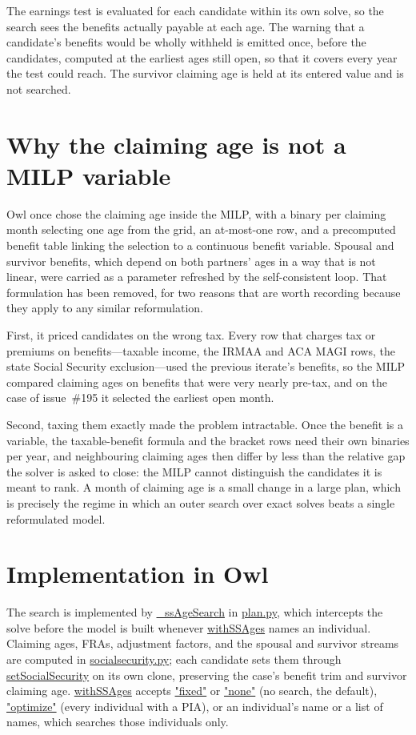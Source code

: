\documentclass[fleqn,12pt]{report}
\newcommand{\code}[1]{\url{#1}}
\begin{document}
The earnings test is evaluated for each candidate within its own solve, so the
search sees the benefits actually payable at each age.
The warning that a candidate's benefits would be wholly withheld is emitted once,
before the candidates, computed at the earliest ages still open, so that it
covers every year the test could reach.
The survivor claiming age is held at its entered value and is not searched.

\section{Why the claiming age is not a MILP variable}
\label{sec:ss-why-not-mip}

Owl once chose the claiming age inside the MILP, with a binary per claiming month
selecting one age from the grid, an at-most-one row, and a precomputed benefit
table linking the selection to a continuous benefit variable.
Spousal and survivor benefits, which depend on both partners' ages in a way that
is not linear, were carried as a parameter refreshed by the self-consistent loop.
That formulation has been removed, for two reasons that are worth recording
because they apply to any similar reformulation.

First, it priced candidates on the wrong tax.
Every row that charges tax or premiums on benefits---taxable income, the IRMAA
and ACA MAGI rows, the state Social Security exclusion---used the previous
iterate's benefits, so the MILP compared claiming ages on benefits that were
very nearly pre-tax, and on the case of issue~\#195 it selected the earliest
open month.

Second, taxing them exactly made the problem intractable.
Once the benefit is a variable, the taxable-benefit formula and the bracket rows
need their own binaries per year, and neighbouring claiming ages then differ by
less than the relative gap the solver is asked to close: the MILP cannot
distinguish the candidates it is meant to rank.
A month of claiming age is a small change in a large plan, which is precisely
the regime in which an outer search over exact solves beats a single
reformulated model.

\section{Implementation in Owl}

The search is implemented by \code{_ssAgeSearch} in \code{plan.py}, which
intercepts the solve before the model is built whenever \code{withSSAges} names
an individual.
Claiming ages, FRAs, adjustment factors, and the spousal and survivor streams
are computed in \code{socialsecurity.py}; each candidate sets them through
\code{setSocialSecurity} on its own clone, preserving the case's benefit trim and
survivor claiming age.
\code{withSSAges} accepts \code{"fixed"} or \code{"none"} (no search, the
default), \code{"optimize"} (every individual with a PIA), or an individual's
name or a list of names, which searches those individuals only.
\end{document}
